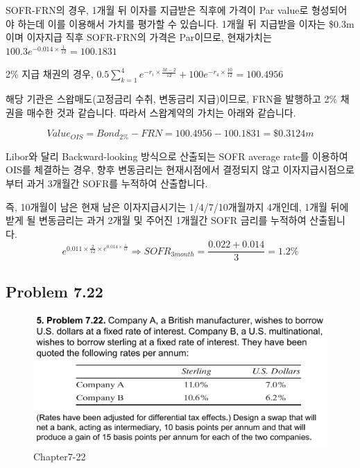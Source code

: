 \documentclass[
  letterpaper,
  DIV=11,
  numbers=noendperiod]{scrreprt}
\begin{document}
SOFR-FRN의 경우, 1개월 뒤 이자를 지급받은 직후에 가격이 Par value로
형성되어야 하는데 이를 이용해서 가치를 평가할 수 있습니다. 1개월 뒤
지급받을 이자는 \$0.3m이며 이자지급 직후 SOFR-FRN의 가격은 Par이므로,
현재가치는 \(100.3e^{-0.014\times\frac{1}{12}}=100.1831\)

2\% 지급 채권의 경우,
\(0.5\sum_{k=1}^4e^{-r_i\times\frac{3k-2}{12}}+100e^{-r_4\times\frac{10}{12}}=100.4956\)

해당 기관은 스왑매도(고정금리 수취, 변동금리 지급)이므로, FRN을 발행하고
2\% 채권을 매수한 것과 같습니다. 따라서 스왑계약의 가치는 아래와
같습니다.

\[Value_{OIS}=Bond_{2\%}-FRN=100.4956-100.1831=\$0.3124m\]

\begin{tcolorbox}[enhanced jigsaw, titlerule=0mm, bottomtitle=1mm, left=2mm, title=\textcolor{quarto-callout-note-color}{\faInfo}\hspace{0.5em}{OIS vs.~Libor-IRS}, toptitle=1mm, bottomrule=.15mm, colframe=quarto-callout-note-color-frame, breakable, opacityback=0, rightrule=.15mm, opacitybacktitle=0.6, coltitle=black, colback=white, arc=.35mm, colbacktitle=quarto-callout-note-color!10!white, toprule=.15mm, leftrule=.75mm]

Libor와 달리 Backward-looking 방식으로 산출되는 SOFR average rate를
이용하여 OIS를 체결하는 경우, 향후 변동금리는 현재시점에서 결정되지 않고
이자지급시점으로부터 과거 3개월간 SOFR를 누적하여 산출합니다.

즉, 10개월이 남은 현재 남은 이자지급시기는 1/4/7/10개월까지 4개인데,
1개월 뒤에 받게 될 변동금리는 과거 2개월 및 주어진 1개월간 SOFR 금리를
누적하여 산출됩니다.
\[e^{0.011\times\frac{2}{12}\times e^{0.014\times\frac{1}{12}}}\Rightarrow SOFR_{3month}=\frac{0.022+0.014}{3}=1.2\%\]

\end{tcolorbox}

\subsection*{\texorpdfstring{\textbf{Problem
7.22}}{Problem 7.22}}\label{problem-7.22}

\begin{figure}[H]

{\centering \includegraphics{images/선물옵션_7-22.png}

}

\caption{Chapter7-22}

\end{figure}%
\end{document}
